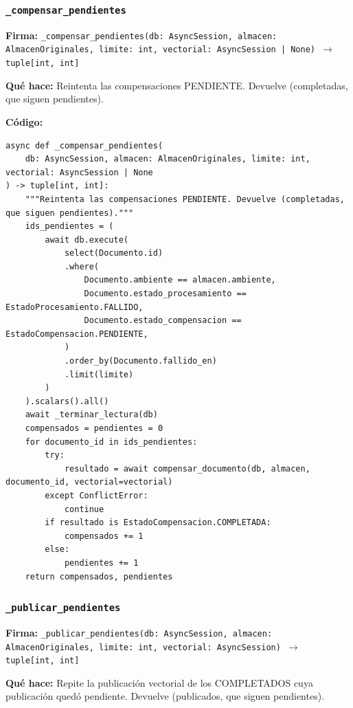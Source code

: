 \documentclass[11pt,a4paper]{article}
\begin{document}
\subsubsection*{\texttt{\_compensar\_pendientes}}
\textbf{Firma:} \texttt{\_compensar\_pendientes(db: AsyncSession, almacen: AlmacenOriginales, limite: int, vectorial: AsyncSession | None) $\rightarrow$ tuple[int, int]}

\textbf{Qué hace:} Reintenta las compensaciones PENDIENTE. Devuelve (completadas, que siguen pendientes).

\textbf{Código:}
\begin{lstlisting}
async def _compensar_pendientes(
    db: AsyncSession, almacen: AlmacenOriginales, limite: int, vectorial: AsyncSession | None
) -> tuple[int, int]:
    """Reintenta las compensaciones PENDIENTE. Devuelve (completadas, que siguen pendientes)."""
    ids_pendientes = (
        await db.execute(
            select(Documento.id)
            .where(
                Documento.ambiente == almacen.ambiente,
                Documento.estado_procesamiento == EstadoProcesamiento.FALLIDO,
                Documento.estado_compensacion == EstadoCompensacion.PENDIENTE,
            )
            .order_by(Documento.fallido_en)
            .limit(limite)
        )
    ).scalars().all()
    await _terminar_lectura(db)
    compensados = pendientes = 0
    for documento_id in ids_pendientes:
        try:
            resultado = await compensar_documento(db, almacen, documento_id, vectorial=vectorial)
        except ConflictError:
            continue
        if resultado is EstadoCompensacion.COMPLETADA:
            compensados += 1
        else:
            pendientes += 1
    return compensados, pendientes
\end{lstlisting}

\subsubsection*{\texttt{\_publicar\_pendientes}}
\textbf{Firma:} \texttt{\_publicar\_pendientes(db: AsyncSession, almacen: AlmacenOriginales, limite: int, vectorial: AsyncSession) $\rightarrow$ tuple[int, int]}

\textbf{Qué hace:} Repite la publicación vectorial de los COMPLETADOS cuya publicación quedó pendiente.
Devuelve (publicados, que siguen pendientes).
\end{document}
